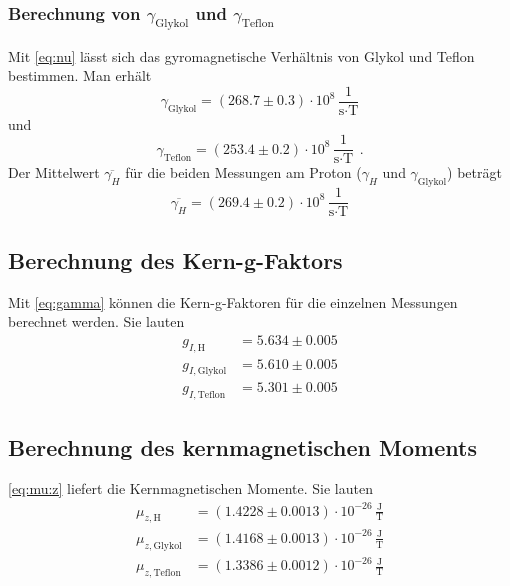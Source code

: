 \subsubsection{Berechnung von $\gamma_\text{Glykol}$ und $\gamma_\text{Teflon}$}
Mit \autoref{eq:nu} lässt sich das gyromagnetische Verhältnis von Glykol und Teflon bestimmen.
Man erhält
\begin{equation}
  \gamma_{\text{Glykol}} = (268.7 \pm 0.3) \cdot 10^8\,\frac{1}{\text{s} \cdot \text{T}}
\end{equation}
und
\begin{equation}
  \gamma_{\text{Teflon}} = (253.4 \pm 0.2) \cdot 10^8\,\frac{1}{\text{s} \cdot \text{T}} \ \, .
\end{equation}
Der Mittelwert $\overline{\gamma_H}$ für die beiden Messungen am Proton ($\gamma_{H}$ und $\gamma_{\text{Glykol}}$) beträgt
\begin{equation}
\label{}
\overline{\gamma_H} = (269.4 \pm 0.2) \cdot 10^8\,\frac{1}{\text{s} \cdot \text{T}}
\end{equation}


\subsection{Berechnung des Kern-g-Faktors}
Mit \autoref{eq:gamma} können die Kern-g-Faktoren für die einzelnen Messungen berechnet werden.
Sie lauten
\begin{equation}
\label{}
\begin{split}
g_{I,\text{H}}&= 5.634	\pm 0.005\\
g_{I,\text{Glykol}}&= 5.610	\pm 0.005\\
g_{I,\text{Teflon}}&= 5.301 \pm	0.005
\end{split}
\end{equation}


\subsection{Berechnung des kernmagnetischen Moments}
\autoref{eq:mu:z} liefert die Kernmagnetischen Momente. Sie lauten
\begin{equation}
\label{}
\begin{split}
\mu_{z,\text{H}}&= (1.4228	\pm 0.0013) \cdot 10^{-26}\,\frac{\text{J}}{\text{T}}\\
\mu_{z,\text{Glykol}}&= (1.4168	\pm 0.0013) \cdot 10^{-26}\,\frac{\text{J}}{\text{T}}\\
\mu_{z,\text{Teflon}}&= (1.3386	\pm 0.0012) \cdot 10^{-26}\,\frac{\text{J}}{\text{T}}
\end{split}
\end{equation}

